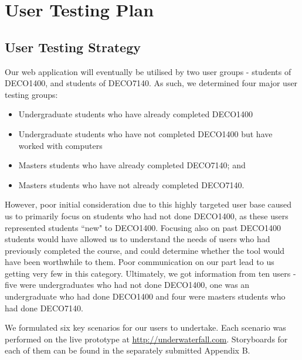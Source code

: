 \documentclass[10pt]{article}
\begin{document}
\newpage

\section*{User Testing Plan}

\subsection*{User Testing Strategy}

Our web application will eventually be utilised by two user groups - students of DECO1400, and students of DECO7140. As such, we determined four major user testing groups:

\begin{itemize}
\item Undergraduate students who have already completed DECO1400
\item Undergraduate students who have not completed DECO1400 but have worked with computers
\item Masters students who have already completed DECO7140; and
\item Masters students who have not already completed DECO7140.
\end{itemize}

However, poor initial consideration due to this highly targeted user base caused us to primarily focus on students who had not done DECO1400, as these users represented students ``new" to DECO1400. Focusing also on past DECO1400 students would have allowed us to understand the needs of users who had previously completed the course, and could determine whether the tool would have been worthwhile to them. Poor communication on our part lead to us getting very few in this category. Ultimately, we got information from ten users - five were undergraduates who had not done DECO1400, one was an undergraduate who had done DECO1400 and four were masters students who had done DECO7140.

We formulated six key scenarios for our users to undertake. Each scenario was performed on the live prototype at \underline{\url{http://underwaterfall.com}}. Storyboards for each of them can be found in the separately submitted Appendix B.
\end{document}
